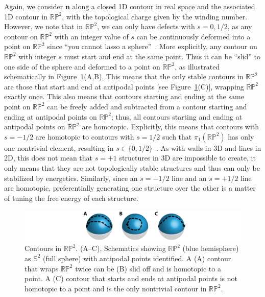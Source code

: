 Again, we consider $\mathbf{n}$ along a closed 1D contour in real space and the associated 1D contour in $\mathbb{R}\mathbb{P}^2$, with the topological charge given by the winding number.
However, we note that in $\mathbb{R}\mathbb{P}^2$, we can only have defects with $s =0,1/2$, as any contour on $\mathbb{R}\mathbb{P}^2$ with an integer value of $s$ can be continuously deformed into a point on $\mathbb{R}\mathbb{P}^2$ since ``you cannot lasso a sphere''~\cite{RN153}.
More explicitly, any contour on  $\mathbb{R}\mathbb{P}^2$ with integer $s$ must start and end at the same point.
Thus it can be ``slid'' to one side of the sphere and deformed to a point on $\mathbb{R}\mathbb{P}^2$, as illustrated schematically in Figure~\ref{f:2-RP2}(A,B).
This means that the only stable contours in $\mathbb{R}\mathbb{P}^2$ are those that start and end at antipodal points [see Figure~\ref{f:2-RP2}(C)], wrapping $\mathbb{R}\mathbb{P}^2$ exactly once.
This also means that contours starting and ending at the same point on $\mathbb{R}\mathbb{P}^2$ can be freely added and subtracted from a contour starting and ending at antipodal points on $\mathbb{R}\mathbb{P}^2$; thus, all contours starting and ending at antipodal points on $\mathbb{R}\mathbb{P}^2$ are homotopic.
Explicitly, this means that contours with $s = -1/2$ are homotopic to contours with $s = 1/2$ such that $\pi_1(\mathbb{R}\mathbb{P}^2)$ has only one nontrivial element, resulting in $s \in \{ 0,1/2\}$~\cite{RN153}.
As with walls in 3D and lines in 2D, this does not mean that $s = +1$ structures in 3D are impossible to create, it only means that they are not topologically stable structures and thus can only be stabilized by energetics.
Similarly, since an $s = -1/2$ line and an $s = +1/2$ line are homotopic, preferentially generating one structure over the other is a matter of tuning the free energy of each structure.
\begin{figure}
  \centering
  \includegraphics{figures/C2/Ch2-Figs_RP2.png}
  \caption{Contours in $\mathbb{RP}^2$.
  (A--C), Schematics showing $\mathbb{RP}^2$ (blue hemisphere) as $\mathbb{S}^2$ (full sphere) with antipodal points identified.
  A (A) contour that wraps $\mathbb{RP}^2$ twice can be (B) slid off and is homotopic to a point.
  A (C) contour that starts and ends at antipodal points is not homotopic to a point and is the only nontrivial contour in $\mathbb{RP}^2$.}\label{f:2-RP2}
\end{figure}

